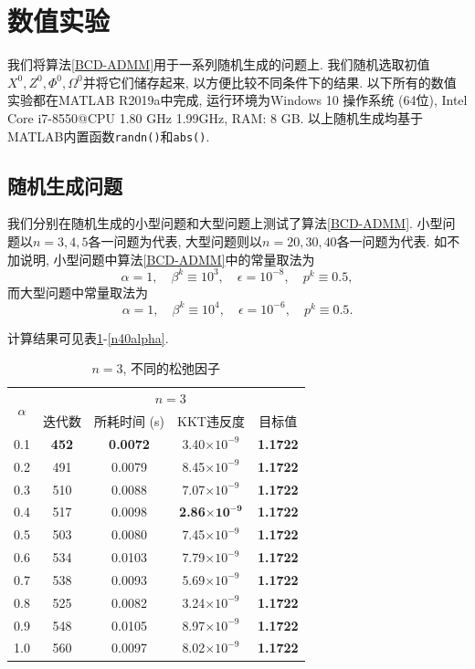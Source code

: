 \documentclass[UTF8,10.5pt,a4paper]{ctexart}
\theoremstyle{definition}
\theoremstyle{definition}
\begin{document}
\newpage
\section{数值实验}\label{numerical experiments}
我们将算法\ref{BCD-ADMM}用于一系列随机生成的问题上. 我们随机选取初值$X^0,Z^0,\Phi^0,\Omega^0$并将它们储存起来, 以方便比较不同条件下的结果. 以下所有的数值实验都在MATLAB R2019a中完成, 运行环境为Windows 10 操作系统 (64位), Intel Core i7-8550@CPU 1.80 GHz 1.99GHz, RAM: 8 GB. 以上随机生成均基于MATLAB内置函数\texttt{randn()}和\texttt{abs()}.

\subsection{随机生成问题}
我们分别在随机生成的小型问题和大型问题上测试了算法\ref{BCD-ADMM}. 小型问题以$n=3,4,5$各一问题为代表, 大型问题则以$n=20,30,40$各一问题为代表. 如不加说明, 小型问题中算法\ref{BCD-ADMM}中的常量取法为
$$\alpha=1,\quad\beta^k\equiv10^3,\quad\epsilon=10^{-8},\quad p^k\equiv0.5,$$
而大型问题中常量取法为
$$\alpha=1,\quad\beta^k\equiv10^4,\quad\epsilon=10^{-6},\quad p^k\equiv0.5.$$

计算结果可见表\ref{n3alpha}-\ref{n40alpha}. 
\begin{table}[htbp]
	\renewcommand{\captionfont}{\small}
    \centering
    \caption{$n=3$, 不同的松弛因子}
    \label{n3alpha}
    \vskip 4mm
    \begin{tabular}{c|c|c|c|c}
        \hline
        \multirow{2}{*}{$\alpha$} & \multicolumn{4}{c}{$n=3$}\\\cline{2-5}
          & 迭代数 & 所耗时间 (s) & KKT违反度 & 目标值\\\hline
        0.1 & \textbf{452} & \textbf{0.0072} & 3.40$\times10^{-9}$ & \textbf{1.1722} \\\hline
        0.2 & 491 & 0.0079 & 8.45$\times10^{-9}$ & \textbf{1.1722} \\\hline
        0.3 & 510 & 0.0088 & 7.07$\times10^{-9}$ & \textbf{1.1722} \\\hline
        0.4 & 517 & 0.0098 & \textbf{2.86$\mathbf{\times10^{-9}}$} & \textbf{1.1722} \\\hline
        0.5 & 503 & 0.0080 & 7.45$\times10^{-9}$ & \textbf{1.1722} \\\hline
        0.6 & 534 & 0.0103 & 7.79$\times10^{-9}$ & \textbf{1.1722} \\\hline
        0.7 & 538 & 0.0093 & 5.69$\times10^{-9}$ & \textbf{1.1722} \\\hline
        0.8 & 525 & 0.0082 & 3.24$\times10^{-9}$ & \textbf{1.1722} \\\hline
        0.9 & 548 & 0.0105 & 8.97$\times10^{-9}$ & \textbf{1.1722} \\\hline
        1.0 & 560 & 0.0097 & 8.02$\times10^{-9}$ & \textbf{1.1722} \\\hline
    \end{tabular}
\end{table}
\end{document}

